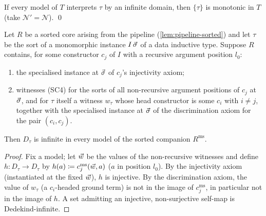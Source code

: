 \begin{lemma}
\label{lem:forced-infinite}
If every model of $T$ interprets $\tau$ by an infinite domain, then
$\{\tau\}$ is monotonic in $T$ (take $\mathcal{N}' = \mathcal{N}$).
\qed
\end{lemma}

\begin{lemma}
\label{lem:ind-infinity}
Let $R$ be a sorted core arising from the pipeline
(\cref{lem:pipeline-sorted}) and let $\tau$ be the sort of a
monomorphic instance $I\,\vec{\sigma}$ of a data inductive type.
Suppose $R$ contains, for some constructor $c_j$ of $I$ with a
recursive argument position $l_0$:
\begin{enumerate}[label=(\roman*)]
\item the specialised instance at $\vec{\sigma}$ of $c_j$'s
  injectivity axiom;
\item witnesses (SC4) for the sorts of all non-recursive argument
  positions of $c_j$ at $\vec{\sigma}$, and for $\tau$ itself a
  witness $w_\tau$ whose head constructor is some $c_i$ with $i
  \neq j$, together with the specialised instance at $\vec{\sigma}$
  of the discrimination axiom for the pair $(c_i, c_j)$.
\end{enumerate}
Then $D_\tau$ is infinite in every model of the sorted companion
$R^{\mathrm{ms}}$.
\end{lemma}

\begin{proof}
Fix a model; let $\vec{w}$ be the values of the non-recursive
witnesses and define $h : D_\tau \to D_\tau$ by $h(a) \coloneqq
c_j^{\mathrm{ms}}(\vec{w}, a)$ ($a$ in position $l_0$).  By the
injectivity axiom (instantiated at the fixed $\vec{w}$), $h$ is
injective.  By the discrimination axiom, the value of $w_\tau$
(a $c_i$-headed ground term) is not in the image of
$c_j^{\mathrm{ms}}$, in particular not in the image of $h$.  A set
admitting an injective, non-surjective self-map is
Dedekind-infinite.
\end{proof}

